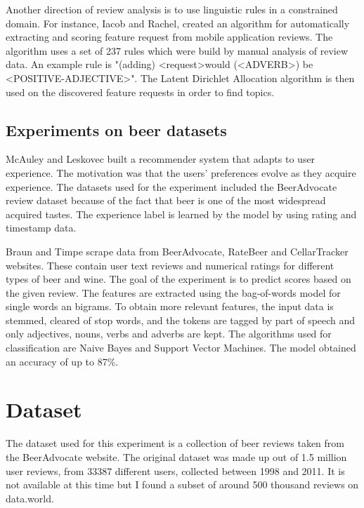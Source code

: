 \documentclass[12pt]{article}
\begin{document}
	Another direction of review analysis is to use linguistic rules in a constrained domain. For instance, Iacob and Rachel\cite{MARA}, created an algorithm for automatically extracting and scoring feature request from mobile application reviews. The algorithm uses a set of 237 rules which were build by manual analysis of review data. An example rule is "(adding) \textless request\textgreater would (\textless ADVERB\textgreater) be \textless POSITIVE-ADJECTIVE\textgreater". The Latent Dirichlet Allocation algorithm is then used on the discovered feature requests in order to find topics.
	
	\subsection{Experiments on beer datasets}
	McAuley and Leskovec\cite{ExperienceReview} built a recommender system that adapts to user experience. The motivation was that the users' preferences evolve as they acquire experience. The datasets used for the experiment included the BeerAdvocate review dataset\cite{BeerAdvocateData} because of the fact that beer is one of the most widespread acquired tastes. The experience label is learned by the model by using rating and timestamp data.
	
	Braun and Timpe\cite{BeerWineReviews} scrape data from BeerAdvocate, RateBeer and CellarTracker websites. These contain user text reviews and numerical ratings for different types of beer and wine. The goal of the experiment is to predict scores based on the given review. The features are extracted using the bag-of-words model for single words an bigrams. To obtain more relevant features, the input data is stemmed, cleared of stop words, and the tokens are tagged by part of speech and only adjectives, nouns, verbs and adverbs are kept. The algorithms used for classification are Naive Bayes and Support Vector Machines. The model obtained an accuracy of up to 87\%.
	
	\section{Dataset}
	The dataset used for this experiment is a collection of beer reviews taken from the BeerAdvocate website. The original dataset was made up out of 1.5 million user reviews, from 33387 different users, collected between 1998 and 2011. It is not available at this time but I found a subset of around 500 thousand reviews on data.world\cite{BeerAdvocateData}. 
	
\end{document}
